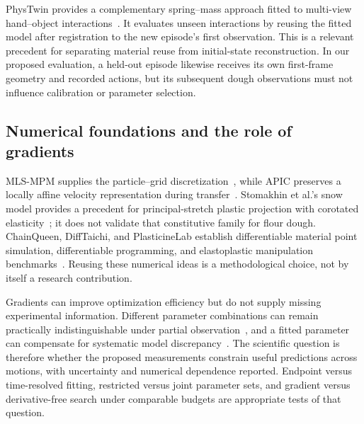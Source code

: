 PhysTwin provides a complementary spring--mass approach fitted to multi-view hand--object interactions~\cite{phystwin2025}. It evaluates unseen interactions by reusing the fitted model after registration to the new episode's first observation. This is a relevant precedent for separating material reuse from initial-state reconstruction. In our proposed evaluation, a held-out episode likewise receives its own first-frame geometry and recorded actions, but its subsequent dough observations must not influence calibration or parameter selection.

\subsection{Numerical foundations and the role of gradients}

MLS-MPM supplies the particle--grid discretization~\cite{mls2018}, while APIC preserves a locally affine velocity representation during transfer~\cite{apic2015}. Stomakhin et al.'s snow model provides a precedent for principal-stretch plastic projection with corotated elasticity~\cite{snow2013}; it does not validate that constitutive family for flour dough. ChainQueen, DiffTaichi, and PlasticineLab establish differentiable material point simulation, differentiable programming, and elastoplastic manipulation benchmarks~\cite{chainqueen2019,difftaichi2020,plasticinelab2021}. Reusing these numerical ideas is a methodological choice, not by itself a research contribution.

Gradients can improve optimization efficiency but do not supply missing experimental information. Different parameter combinations can remain practically indistinguishable under partial observation~\cite{raue2009}, and a fitted parameter can compensate for systematic model discrepancy~\cite{discrepancy2014}. The scientific question is therefore whether the proposed measurements constrain useful predictions across motions, with uncertainty and numerical dependence reported. Endpoint versus time-resolved fitting, restricted versus joint parameter sets, and gradient versus derivative-free search under comparable budgets are appropriate tests of that question.
